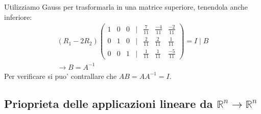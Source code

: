 \documentclass{article}
\begin{document}
Utilizziamo Gauss per trasformarla in una matrice superiore, tenendola anche inferiore:
\begin{align*}
    (R_1-2R_2)
    \begin{pmatrix}
        1&0&0&|&\frac{7}{11}&\frac{-4}{11}&\frac{-2}{11}\\
        0&1&0&|&\frac{2}{11}&\frac{2}{11}&\frac{1}{11}\\
        0&0&1&|&\frac{1}{11}&\frac{1}{11}&\frac{-5}{11}
    \end{pmatrix}=I\mid B
    \\\to B=A^{-1}
\end{align*}
Per verificare si puo' contrallare che $AB=AA^{-1}=I$.

\vspace{3em}
\subsection{Prioprieta delle applicazioni lineare da $\mathbb{R}^n \to \mathbb{R}^n$}
\end{document}
